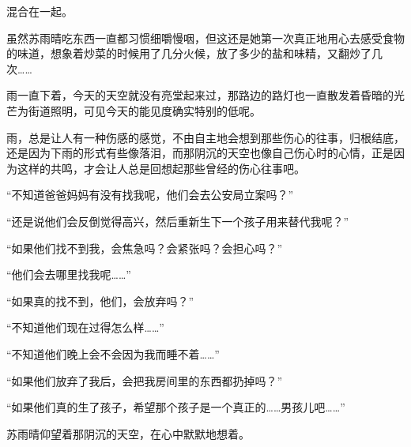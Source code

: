 混合在一起。

虽然苏雨晴吃东西一直都习惯细嚼慢咽，但这还是她第一次真正地用心去感受食物的味道，想象着炒菜的时候用了几分火候，放了多少的盐和味精，又翻炒了几次……

雨一直下着，今天的天空就没有亮堂起来过，那路边的路灯也一直散发着昏暗的光芒为街道照明，可见今天的能见度确实特别的低呢。

雨，总是让人有一种伤感的感觉，不由自主地会想到那些伤心的往事，归根结底，还是因为下雨的形式有些像落泪，而那阴沉的天空也像自己伤心时的心情，正是因为这样的共鸣，才会让人总是回想起那些曾经的伤心往事吧。

“不知道爸爸妈妈有没有找我呢，他们会去公安局立案吗？”

“还是说他们会反倒觉得高兴，然后重新生下一个孩子用来替代我呢？”

“如果他们找不到我，会焦急吗？会紧张吗？会担心吗？”

“他们会去哪里找我呢……”

“如果真的找不到，他们，会放弃吗？”

“不知道他们现在过得怎么样……”

“不知道他们晚上会不会因为我而睡不着……”

“如果他们放弃了我后，会把我房间里的东西都扔掉吗？”

“如果他们真的生了孩子，希望那个孩子是一个真正的……男孩儿吧……”

苏雨晴仰望着那阴沉的天空，在心中默默地想着。

